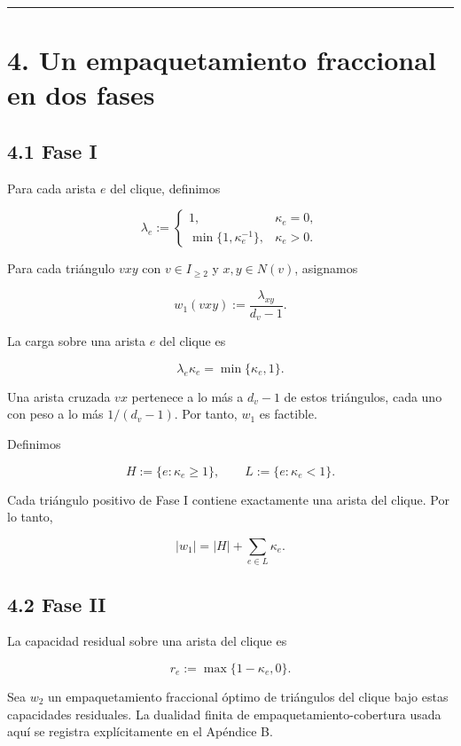 \documentclass[
  11pt,
]{article}
\begin{document}
\begin{center}\rule{0.5\linewidth}{0.5pt}\end{center}

\section{4. Un empaquetamiento fraccional en dos
fases}\label{un-empaquetamiento-fraccional-en-dos-fases}

\subsection{4.1 Fase I}\label{fase-i}

Para cada arista \(e\) del clique, definimos

\[
\lambda_e
:=
\begin{cases}
1,&\kappa_e=0,\\[1mm]
\min\{1,\kappa_e^{-1}\},&\kappa_e>0.
\end{cases}
\]

Para cada triángulo \(vxy\) con \(v\in I_{\ge2}\) y \(x,y\in N(v)\),
asignamos

\[
w_1(vxy)
:=
\frac{\lambda_{xy}}{d_v-1}.
\tag{4.1}
\]

La carga sobre una arista \(e\) del clique es

\[
\lambda_e\kappa_e
=
\min\{\kappa_e,1\}.
\tag{4.2}
\]

Una arista cruzada \(vx\) pertenece a lo más a \(d_v-1\) de estos
triángulos, cada uno con peso a lo más \(1/(d_v-1)\). Por tanto, \(w_1\)
es factible.

Definimos

\[
H:=\{e:\kappa_e\ge1\},
\qquad
L:=\{e:\kappa_e<1\}.
\]

Cada triángulo positivo de Fase I contiene exactamente una arista del
clique. Por lo tanto,

\[
|w_1|
=
|H|+\sum_{e\in L}\kappa_e.
\tag{4.3}
\]

\subsection{4.2 Fase II}\label{fase-ii}

La capacidad residual sobre una arista del clique es

\[
r_e:=\max\{1-\kappa_e,0\}.
\tag{4.4}
\]

Sea \(w_2\) un empaquetamiento fraccional óptimo de triángulos del
clique bajo estas capacidades residuales. La dualidad finita de
empaquetamiento-cobertura usada aquí se registra explícitamente en el
Apéndice B.
\end{document}
